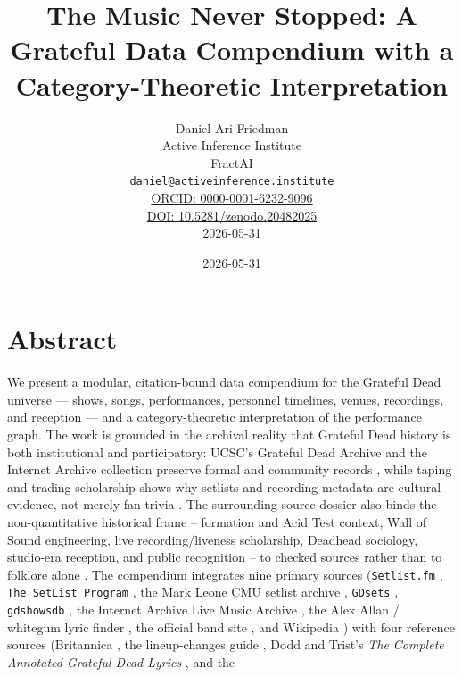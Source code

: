 \documentclass[
]{article}
\author{}
\date{}
\title{The Music Never Stopped: A Grateful Data Compendium with a Category-Theoretic Interpretation}
\author{Daniel Ari Friedman\\\footnotesize{Active Inference Institute}\\\footnotesize{FractAI}\\\footnotesize{\texttt{daniel@activeinference.institute}}\\\footnotesize{\href{https://orcid.org/0000-0001-6232-9096}{ORCID: 0000-0001-6232-9096}} \\ \footnotesize{\href{https://doi.org/10.5281/zenodo.20482025}{DOI: 10.5281/zenodo.20482025}} \\ \footnotesize{2026-05-31}}
\date{2026-05-31}
\begin{document}
\maketitle
\thispagestyle{empty}
\tableofcontents
\newpage


\section{Abstract}\label{abstract}

We present a modular, citation-bound data compendium for the Grateful
Dead universe --- shows, songs, performances, personnel timelines,
venues, recordings, and reception --- and a category-theoretic
interpretation of the performance graph. The work is grounded in the
archival reality that Grateful Dead history is both institutional and
participatory: UCSC's Grateful Dead Archive and the Internet Archive
collection preserve formal and community records
\citep{ucsc_grateful_dead_archive, internet_archive_lma, internet_archive_gd_collection_policy},
while taping and trading scholarship shows why setlists and recording
metadata are cultural evidence, not merely fan trivia
\citep{dead_net_taping_dead, wallace_cocreation_sound_archive}. The
surrounding source dossier also binds the non-quantitative historical
frame -- formation and Acid Test context, Wall of Sound engineering,
live recording/liveness scholarship, Deadhead sociology, studio-era
reception, and public recognition -- to checked sources rather than to
folklore alone
\citep{dead_net_biography, foundsf_weir_psychedelic_sf, smithsonian_institutionally_dead, mcintosh_wall_of_sound, brackett_live_dead, adams_deadhead_social_science, rockhall_grateful_dead, grammy_lifetime_achievement, kennedy_center_honors_2024}.
The compendium integrates nine primary sources (\texttt{Setlist.fm}
\citep{setlistfm_gd}, \texttt{The\ SetList\ Program}
\citep{setlists_net_program}, the Mark Leone CMU setlist archive
\citep{cmu_leone_setlists, noah_truckin_through_time}, \texttt{GDsets}
\citep{gdsets_com, gdsets_dead}, \texttt{gdshowsdb}
\citep{gdshowsdb, github_topic_gratefuldead}, the Internet Archive Live
Music Archive \citep{internet_archive_lma, fifteen_songs_dataset}, the
Alex Allan / whitegum lyric finder
\citep{whitegum_alex_allan, cmu_leone_lyrics}, the official band site
\citep{dead_net_official}, and Wikipedia
\citep{wikipedia_gd, wikipedia_discography}) with four reference sources
(Britannica \citep{britannica_gd}, the lineup-changes guide
\citep{ucr_lineup_changes}, Dodd and Trist's \emph{The Complete
Annotated Grateful Dead Lyrics} \citep{dodd_annotated_lyrics}, and the
\end{document}
